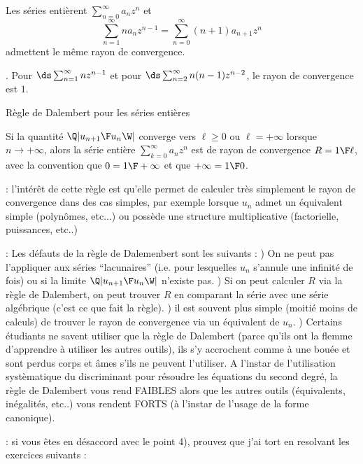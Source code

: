 Les séries entièrent $\sum_{n=0}^\infty a_nz^n$ et 
$$
\sum\limits_{n=1}^\infty na_nz^{n-1}=\sum\limits_{n=0}^\infty(n+1)a_{n+1}z^n
$$ 
admettent le même rayon de convergence. 

\Exemple. Pour $\ds \sum_{n=1}^\infty nz^{n-1}$ et pour $\ds \sum_{n=2}^\infty n(n-1)z^{n-2}$, 
le rayon de convergence est $1$. 


\Concept Règle de Dalembert pour les séries entières

Si la quantité $\Q|{u_{n+1}\F u_n}\W|$ converge vers $\ell\ge0$ ou $\ell=+\infty$ lorsque $n\to+\infty$, 
alors la série entière $\sum_{k=0}^\infty a_nz^n$ est de rayon de convergence $R={1\F \ell}$, avec la convention que $0={1\F+\infty}$ et que $+\infty=1\F 0$. 

\Remarque : l'intérêt de cette règle est qu'elle permet de calculer très simplement le rayon de convergence dans des cas simples, par exemple lorsque $u_n$ admet un équivalent simple (polynômes, etc...) ou possède une structure multiplicative (factorielle, puissances, etc..)

\Remarque : Les défauts de la règle de Dalemenbert sont les suivants : ) On ne peut pas l'appliquer aux séries ``lacunaires'' (i.e. pour lesquelles $u_n$ s'annule une infinité de fois) ou si la limite $\Q|{u_{n+1}\F u_n}\W|$ n'existe pas. ) Si on peut calculer $R$ via la règle de Dalembert, on peut trouver $R$ en comparant la série avec une série algébrique (c'est ce que fait la règle). ) il est souvent plus simple (moitié moins de calculs) de trouver le rayon de convergence via un équivalent de $u_n$. ) Certains étudiants ne savent utiliser que la règle de Dalembert (parce qu'ils ont la flemme d'apprendre à utiliser les autres outils), ils s'y accrochent comme à une bouée et sont perdus corps et âmes s'ils ne peuvent l'utiliser. 
A l'instar de l'utilisation systèmatique du discriminant pour résoudre les équations du second degré, 
la règle de Dalembert vous rend FAIBLES alors que les autres outils (équivalents, inégalités, etc..) vous rendent FORTS (à l'instar de l'usage de la forme canonique). 
\bigskip

\Remarque : si vous êtes en désaccord avec le point 4), prouvez que j'ai tort en resolvant les exercices suivants : 

%

%

%

